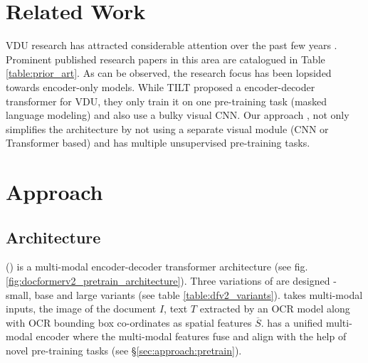 \documentclass[10pt,twocolumn,letterpaper]{article}
\begin{document}
\section{Related Work}
\label{sec:related_work}
VDU research has attracted considerable attention over the past few years \cite{Wang2022ABF,xu2020layoutlm,xu2020layoutlmv2,appalaraju2021docformer,Li2021SelfDoc,powalski2021going,Li2021MarkupLM,huang2022layoutlmv3,hong2020bros,Gu2022UnifiedUDOC,Gu2022XYLayoutLM,Lee2022FormNet,Wang2022LiLT,Chen2022XDoc,Tang2022UnifyingUDOP,Borchmann2021DUE,peng2022ernie,li2021structurallm}. Prominent published research papers in this area are catalogued in Table \ref{table:prior_art}. As can be observed, the research focus has been lopsided towards encoder-only models. While TILT \cite{powalski2021going} proposed a encoder-decoder transformer for VDU, they only train it on one pre-training task (masked language modeling) and also use a bulky visual CNN. Our approach \papertitle, not only simplifies the architecture by not using a separate visual module (CNN or Transformer based) and has multiple unsupervised pre-training tasks. 














\section{Approach}
\label{sec:approach}


\subsection{Architecture}
\label{sec:approach:arch}

\papertitle (\papertitleshort) is a multi-modal encoder-decoder transformer architecture (see fig. \ref{fig:docformerv2_pretrain_architecture}). Three variations of \papertitleshort are designed - small, base and large variants (see table \ref{table:dfv2_variants}).
\papertitleshort takes multi-modal inputs, the image of the document $I$, text $T$ extracted by an OCR model along with OCR bounding box co-ordinates as spatial features $\overline{S}$. \papertitleshort has a unified multi-modal encoder where the multi-modal features fuse and align with the help of novel pre-training tasks (see \S \ref{sec:approach:pretrain}). 
\end{document}

